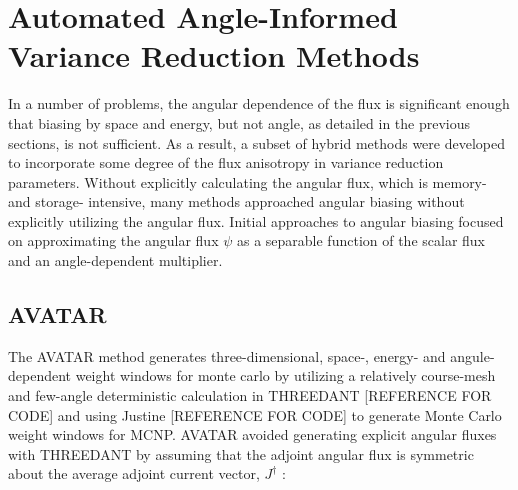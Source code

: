\section{Automated Angle-Informed Variance Reduction Methods}
\label{sec:AngleVR}

In a number of problems, the angular dependence of the flux is significant enough that
biasing by space and energy, but not angle, as detailed in the previous sections, is not
sufficient. As a result, a subset of hybrid methods were developed to incorporate some
degree of the flux anisotropy in variance reduction parameters. Without explicitly
calculating the angular flux, which is memory- and storage- intensive, many methods
approached angular biasing without explicitly utilizing the angular flux. Initial approaches
to angular biasing focused on approximating the angular flux $\psi$ as a separable
function of the scalar flux and an angle-dependent multiplier.

\subsection{AVATAR}

The AVATAR \cite{van_riper_generation_1995, van_riper_avatarautomatic_1997} method generates
three-dimensional, space-, energy- and angule-dependent weight windows for monte carlo by
utilizing a relatively course-mesh and few-angle deterministic calculation in THREEDANT
[REFERENCE FOR CODE] and using Justine [REFERENCE FOR CODE] to generate Monte Carlo weight
windows for MCNP. AVATAR avoided generating explicit angular fluxes with THREEDANT by assuming
that the adjoint angular flux is symmetric about the average adjoint current vector,
$J^{\dagger}$ :

